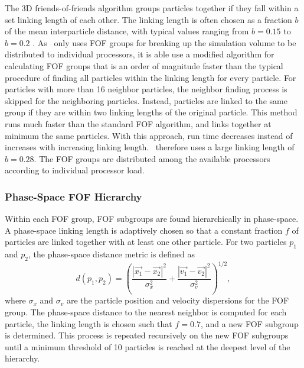 The 3D friends-of-friends algorithm groups particles together if they fall within a set linking length of each other.  The linking length is often chosen as a fraction $b$ of the mean interparticle distance, with typical values ranging from $b = 0.15$ to $b = 0.2$ \citep{2011ApJS..195....4M}.  As \rockstar\ only uses FOF groups for breaking up the simulation volume to be distributed to individual processors, it is able use a modified algorithm for calculating FOF groups that is an order of magnitude faster than the typical procedure of finding all particles within the linking length for every particle.  For particles with more than 16 neighbor particles, the neighbor finding process is skipped for the neighboring particles.  Instead, particles are linked to the same group if they are within two linking lengths of the original particle.  This method runs much faster than the standard FOF algorithm, and links together at minimum the same particles.  With this approach, run time decreases instead of increases with increasing linking length.  \rockstar\ therefore uses a large linking length of $b = 0.28$.  The FOF groups are distributed among the available processors according to individual processor load.



\subsubsection{Phase-Space FOF Hierarchy}
\label{subsubsec:rockstar--halo_finding--phase_space}


Within each FOF group, FOF subgroups are found hierarchically in phase-space.  A phase-space linking length is adaptively chosen so that a constant fraction $f$ of particles are linked together with at least one other particle.  For two particles $p_{1}$ and $p_{2}$, the phase-space distance metric is defined as \citep{1998lsst.conf...43G}
\begin{equation}
	d(p_{1}, p_{2}) = \left( \frac{\left| \vec{x_{1}} - \vec{x_{2}} \right|^{2}}{\sigma_{x}^{2}} + \frac{\left| \vec{v_{1}} - \vec{v_{2}} \right|^{2}}{\sigma_{v}^{2}} \right)^{1/2},
\end{equation}
where $\sigma_{x}$ and $\sigma_{v}$ are the particle position and velocity dispersions for the FOF group.  The phase-space distance to the nearest neighbor is computed for each particle, the linking length is chosen such that $f = 0.7$, and a new FOF subgroup is determined.  This process is repeated recursively on the new FOF subgroups until a minimum threshold of 10 particles is reached at the deepest level of the hierarchy.



